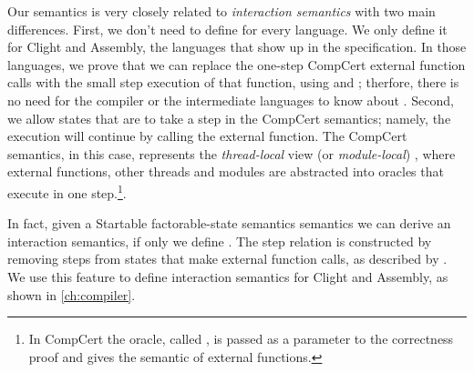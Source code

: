 Our semantics is very closely related to \emph{interaction semantics} \cite{compcomp} with two main differences. First, we don't need to define  for every language. We only define it for Clight and Assembly, the languages that show up in the specification. In those languages, we prove that we can replace the one-step CompCert external function calls with the small step execution of that function, using  and ; therfore, there is no need for the compiler or the intermediate languages to know about .
Second, we allow states that are  to take a step in the CompCert semantics; namely, the execution will continue by calling the external function. The CompCert semantics, in this case, represents the \emph{thread-local} view (or \emph{module-local}) , where external functions, other threads and modules are abstracted into oracles that execute in one step.\footnote{In CompCert the oracle, called , is passed as a parameter to the correctness proof and gives the semantic of external functions.}. 

In fact, given a Startable factorable-state semantics semantics we can derive an interaction semantics, if only we define . The step relation is constructed by removing steps from states that make external function calls, as described by . We use this feature to define interaction semantics for Clight and Assembly, as shown in \autoref{ch:compiler}. 